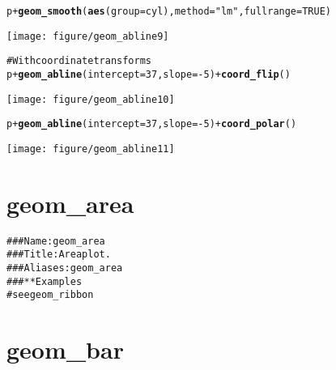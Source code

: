 \documentclass[a4paper,titlepage]{tufte-handout}\usepackage{graphicx, color}
\makeatletter
\def\maxwidth{ %
  \ifdim\Gin@nat@width>\linewidth
    \linewidth
  \else
    \Gin@nat@width
  \fi
}
\newcommand{\hlfunctioncall}[1]{\textcolor[rgb]{0.501960784313725,0,0.329411764705882}{\textbf{#1}}}%
\newcommand{\hlstring}[1]{\textcolor[rgb]{0.6,0.6,1}{#1}}%
\newcommand{\hlcomment}[1]{\textcolor[rgb]{0.180392156862745,0.6,0.341176470588235}{#1}}%
\newenvironment{kframe}{%
 \def\at@end@of@kframe{}%
 \ifinner\ifhmode%
  \def\at@end@of@kframe{\end{minipage}}%
  \begin{minipage}{\columnwidth}%
 \fi\fi%
 \def\FrameCommand##1{\hskip\@totalleftmargin \hskip-\fboxsep
 \colorbox{shadecolor}{##1}\hskip-\fboxsep
     \hskip-\linewidth \hskip-\@totalleftmargin \hskip\columnwidth}%
 \MakeFramed {\advance\hsize-\width
   \@totalleftmargin\z@ \linewidth\hsize
   \@setminipage}}%
 {\par\unskip\endMakeFramed%
 \at@end@of@kframe}
\newenvironment{knitrout}{}{} %
\makeatother
\begin{document}
\begin{knitrout}
\begin{kframe}
\begin{alltt}
p + \hlfunctioncall{geom_smooth}(\hlfunctioncall{aes}(group=cyl), method=\hlstring{"lm"}, fullrange=TRUE)
\end{alltt}
\end{kframe}\texttt{[image: figure/geom\_abline9]} \begin{kframe}\begin{alltt}
\hlcomment{# With coordinate transforms}
p + \hlfunctioncall{geom_abline}(intercept = 37, slope = -5) + \hlfunctioncall{coord_flip}()
\end{alltt}
\end{kframe}\texttt{[image: figure/geom\_abline10]} \begin{kframe}\begin{alltt}
p + \hlfunctioncall{geom_abline}(intercept = 37, slope = -5) + \hlfunctioncall{coord_polar}()
\end{alltt}
\end{kframe}\texttt{[image: figure/geom\_abline11]} 
\end{knitrout}


\section{geom\_area}

\begin{knitrout}
\color{fgcolor}\begin{kframe}
\begin{alltt}
\hlcomment{### Name: geom_area}
\hlcomment{### Title: Area plot.}
\hlcomment{### Aliases: geom_area}
\hlcomment{### ** Examples}
\hlcomment{# see geom_ribbon}
\end{alltt}
\end{kframe}
\end{knitrout}


\section{geom\_bar}
\end{document}
